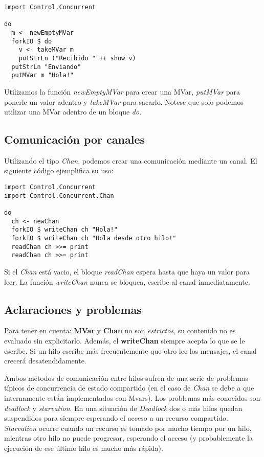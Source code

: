 \begin{lstlisting}
import Control.Concurrent

do
  m <- newEmptyMVar
  forkIO $ do
    v <- takeMVar m
    putStrLn ("Recibido " ++ show v)
  putStrLn "Enviando"
  putMVar m "Hola!"
\end{lstlisting}

Utilizamos la función \textit{newEmptyMVar} para crear una MVar, \textit{putMVar} para ponerle un valor adentro y \textit{takeMVar} para sacarlo. Notese que solo podemos utilizar una MVar adentro de un bloque \textit{do}.


\subsection{Comunicación por canales} %
\label{ssub:comunicaci_n_por_canales}

Utilizando el tipo \textit{Chan}, podemos crear una comunicación mediante un canal. El siguiente código ejemplifica su uso:

\begin{lstlisting}
import Control.Concurrent
import Control.Concurrent.Chan

do
  ch <- newChan
  forkIO $ writeChan ch "Hola!"
  forkIO $ writeChan ch "Hola desde otro hilo!"
  readChan ch >>= print
  readChan ch >>= print
\end{lstlisting}

Si el \textit{Chan} está vacio, el bloque \textit{readChan} espera hasta que haya un valor para leer. La función \textit{writeChan} nunca se bloquea, escribe al canal inmediatamente.


\subsection{Aclaraciones y problemas} %
\label{ssub:aclaraciones_y_problemas}

Para tener en cuenta: \textbf{MVar} y \textbf{Chan} no son \textit{estrictos}, su contenido no es evaluado sin explicitarlo. Además, el \textbf{writeChan} siempre acepta lo que se le escribe. Si un hilo escribe más frecuentemente que otro lee los mensajes, el canal crecerá desatendidamente.

Ambos métodos de comunicación entre hilos sufren de una serie de problemas típicos de concurrencia de estado compartido (en el caso de \textit{Chan} se debe a que internamente están implementados con Mvars). Los problemas más conocidos son \textit{deadlock} y \textit{starvation}. En una situación de \textit{Deadlock} dos o más hilos quedan suspendidos para siempre esperando el acceso a un recurso compartido. \textit{Starvation} ocurre cuando un recurso es tomado por mucho tiempo por un hilo, mientras otro hilo no puede progresar, esperando el acceso (y probablemente la ejecución de ese último hilo es mucho más rápida).

